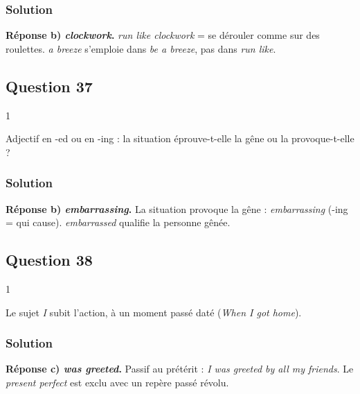 \documentclass[11pt,a4paper]{article}
\begin{document}
\hypertarget{solution-35}{%
\subsubsection{Solution}\label{solution-35}}

\textbf{Réponse b) \emph{clockwork}.} \emph{run like clockwork} = se dérouler comme sur des roulettes. \emph{a breeze} s'emploie dans \emph{be a breeze}, pas dans \emph{run like}.

\hypertarget{question-37}{%
\subsection{Question 37}\label{question-37}}

\begin{indication}{1}

Adjectif en -ed ou en -ing : la situation éprouve-t-elle la gêne ou la provoque-t-elle ?

\end{indication}

\hypertarget{solution-36}{%
\subsubsection{Solution}\label{solution-36}}

\textbf{Réponse b) \emph{embarrassing}.} La situation provoque la gêne : \emph{embarrassing} (-ing = qui cause). \emph{embarrassed} qualifie la personne gênée.

\hypertarget{question-38}{%
\subsection{Question 38}\label{question-38}}

\begin{indication}{1}

Le sujet \emph{I} subit l'action, à un moment passé daté (\emph{When I got home}).

\end{indication}

\hypertarget{solution-37}{%
\subsubsection{Solution}\label{solution-37}}

\textbf{Réponse c) \emph{was greeted}.} Passif au prétérit : \emph{I was greeted by all my friends}. Le \emph{present perfect} est exclu avec un repère passé révolu.
\end{document}
